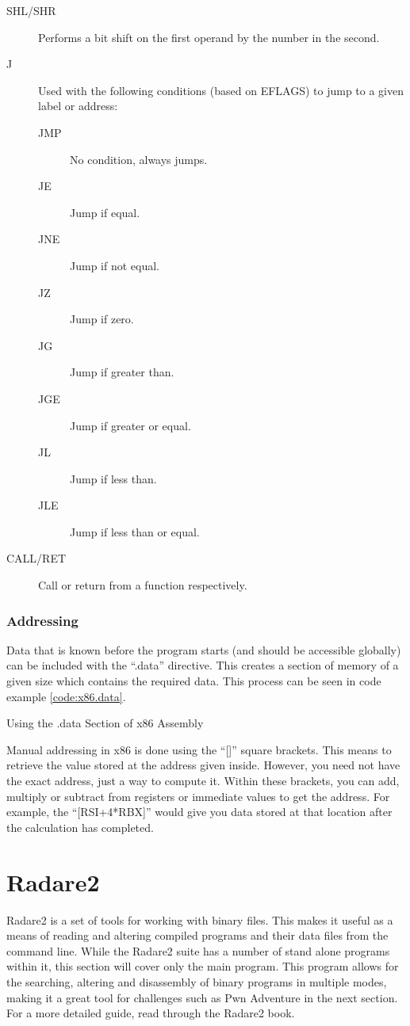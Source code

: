 \begin{description}
					\item[SHL/SHR] Performs a bit shift on the first operand by the number in the second.
					\item[J] Used with the following conditions (based on EFLAGS) to jump to a given label or address:
						\begin{description}
							\item[JMP] No condition, always jumps.
							\item[JE] Jump if equal.
							\item[JNE] Jump if not equal.
							\item[JZ] Jump if zero.
							\item[JG] Jump if greater than.
							\item[JGE] Jump if greater or equal.
							\item[JL] Jump if less than.
							\item[JLE] Jump if less than or equal.
						\end{description}
					\item[CALL/RET] Call or return from a function respectively.
				\end{description}
			\subsubsection{Addressing}
				Data that is known before the program starts (and should be accessible globally) can be included with the ``.data'' directive.
				This creates a section of memory of a given size which contains the required data.
				This process can be seen in code example \ref{code:x86.data}.
				\begin{code}
					\caption{Using the .data Section of x86 Assembly}
					\label{code:x86.data}
				\end{code}

				Manual addressing in x86 is done using the ``[]'' square brackets.
				This means to retrieve the value stored at the address given inside.
				However, you need not have the exact address, just a way to compute it.
				Within these brackets, you can add, multiply or subtract from registers or immediate values to get the address.
				For example, the ``[RSI+4*RBX]'' would give you data stored at that location after the calculation has completed.


	\section{Radare2}
		Radare2 is a set of tools for working with binary files.
		This makes it useful as a means of reading and altering compiled programs and their data files from the command line.
		While the Radare2 suite has a number of stand alone programs within it, this section will cover only the main program.
		This program allows for the searching, altering and disassembly of binary programs in multiple modes, making it a great tool for challenges such as Pwn Adventure in the next section.
		For a more detailed guide, read through the Radare2 book.\cite{Radare2}

